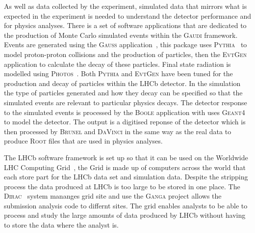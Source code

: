 As well as data collected by the experiment, simulated data that mirrors what is expected in the experiment is needed to understand the detector performance and for physics analyses. There is a set of software applications that are dedicated to the production of Monte Carlo simulated events within the \textsc{Gaudi} framework. Events are generated using the \textsc{Gauss} application~\cite{1742-6596-331-3-032047, Clemencic:2011zza}, this package uses \textsc{Pythia}~\cite{Sjostrand:2006za,Sjostrand:2007gs} to model proton-proton collisions and the production of particles, then the \textsc{Evt}\textsc{Gen}~\cite{Lange:2001uf} application to calculate the decay of these particles. Final state radiation is modelled using \textsc{Photos}~\cite{Golonka:2005pn}. Both \textsc{Pythia} and \textsc{Evt}\textsc{Gen} have been tuned for the production and decay of particles within the LHCb detector. In the simulation the type of particles generated and how they decay can be specified so that the simulated events are relevant to particular physics decays. The detector response to the simulated events is processed by the \textsc{Boole} application with uses \textsc{Geant4}~\cite{Agostinelli:2002hh,Allison:2006ve} to model the detector. The output is a digitised reponse of the detector which is then processed by \textsc{Brunel} and \textsc{DaVinci} in the same way as the real data to produce \textsc{Root} files that are used in physics analyses. %

The LHCb software framework is set up so that it can be used on the Worldwide LHC Computing Grid~\cite{Bird:2011zz, WWCG}, the Grid is made up of computers across the world that each store part for the LHCb data set and simulation data. Despite the stripping process the data produced at LHCb is too large to be stored in one place. The \textsc{Dirac}~\cite{Paterson:1397926} system mananges grid site and use the \textsc{Ganga} project allows the submission analysis code to differnt sites. The grid enables analysts to be able to process and study the large amounts of data produced by LHCb without having to store the data where the analyst is. 





